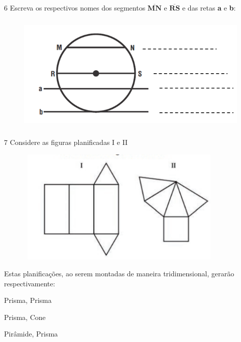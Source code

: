 \begin{escolha}
\begin{escolha}
\num{6} Escreva os respectivos nomes dos segmentos
$\overline{\mathbf{\text{MN}}}$ e $\overline{\mathbf{\text{RS}}}$ e
das retas \textbf{a} e \textbf{b}:

\begin{figure}
\centering
\includegraphics[width=4.87542in,height=2.25019in]{./_SAEB_9_MAT/media/image168.png}
\end{figure}


\num{7} Considere as figuras planificadas I e II

\begin{figure}
\centering
\includegraphics[width=3.93333in,height=2.18333in]{./_SAEB_9_MAT/media/image169.png}
\end{figure}

Estas planificações, ao serem montadas de maneira tridimensional,
gerarão respectivamente:

\begin{minipage}{.5\textwidht}
\begin{escolha}
  \item Prisma, Prisma

  \item Prisma, Cone

  \item Pirâmide, Prisma


\end{escolha}
\end{minipage}
\end{escolha}
\end{escolha}
